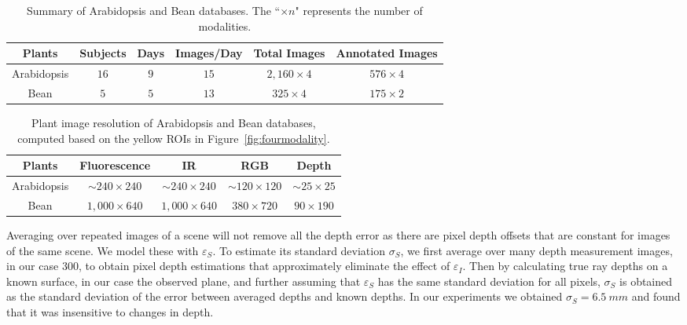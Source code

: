 \begin{table*}[t!]
\begin{center}
\caption{Summary of Arabidopsis and Bean databases. The ``$\times n$" represents the number of modalities.}
\label{tab:stat}
\begin{tabular}{c|c|c|c|c|c}
\hline
Plants & Subjects & Days & Images/Day & Total Images & Annotated Images \\
\hline
Arabidopsis & $16$ & $9$ & $15$ & $2,160\times 4$ & $576\times 4$ \\
\hline
Bean & $5$ & $5$ & $13$ & $325\times 4$ & $175\times 2$ \\
\hline
\end{tabular}
\end{center}
\end{table*}



\begin{table*}
\begin{center}
\caption{Plant image resolution of Arabidopsis and Bean databases, computed based on the yellow ROIs in Figure~\ref{fig:fourmodality}.}
\label{tab:resolution}
\begin{tabular}{c|c|c|c|c}
\hline
Plants & Fluorescence & IR & RGB & Depth \\
\hline
Arabidopsis & $\sim$$240\times240$ & $\sim$$240\times240$ & $\sim$$120\times120$ & $\sim$$25\times25$ \\
Bean & $1,000\times640$ & $1,000\times640$ & $380\times720$ & $90\times190$ \\
\hline
\end{tabular}
\end{center}
\end{table*}

Averaging over repeated images of a scene will not remove all the depth error as there are pixel depth offsets that are constant for images of the same scene.
We model these with $\varepsilon_S$.
To estimate its standard deviation $\sigma_S$, we first average over many depth measurement images, in our case $300$, to obtain pixel depth estimations that approximately eliminate the effect of $\varepsilon_I$. Then by calculating true ray depths on a known surface, in our case the observed plane, and further assuming that $\varepsilon_S$ has the same standard deviation for all pixels, $\sigma_S$ is obtained as the standard deviation of the error between averaged depths and known depths. In our experiments we obtained $\sigma_S=6.5~mm$ and found that it was insensitive to changes in depth.

